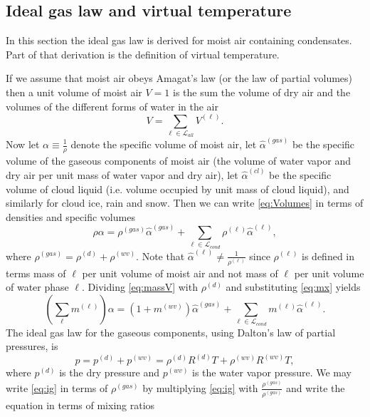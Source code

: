 \documentclass{agujournal}
\begin{document}
%
\subsection{Ideal gas law and virtual temperature}\label{sec:tv}
In this section the ideal gas law is derived for moist air containing condensates. Part of that derivation is the definition of virtual temperature. 

If we assume that moist air obeys Amagat's law (or the law of partial volumes) then a unit volume of moist air $V=1$ is the sum the volume of dry air and the volumes of the different forms of water in the air
\begin{equation}
V=\sum_{\ell \in \mathcal{L}_{all}} V^{(\ell)}.\label{eq:Volumes}
\end{equation}
Now let $\alpha\equiv \frac{1}{\rho}$ denote the specific volume of moist air, let $\hat{\alpha}^{(gas)}$ be the specific volume of the gaseous components of moist air (the volume of water vapor and dry air per unit mass of water vapor and dry air), let $\hat{\alpha}^{(cl)}$ be the specific volume of cloud liquid (i.e. volume occupied by unit mass of cloud liquid), and similarly for cloud ice, rain and snow. Then we can write \eqref{eq:Volumes} in terms of densities and specific volumes
\begin{equation}
\rho \alpha=\rho^{(gas)}\hat{\alpha}^{(gas)}+\sum_{\ell\in \mathcal{L}_{cond}}\rho^{(\ell)}\hat{\alpha}^{(\ell)},\label{eq:massV}
\end{equation}
where $\rho^{(gas)}=\rho^{(d)}+\rho^{(wv)}$. Note that $\hat{\alpha}^{(\ell)}\neq \frac{1}{\rho^{(\ell)}}$ since $\rho^{(\ell)}$ is defined in terms mass of $\ell$ per unit volume of moist air and not mass of $\ell$ per unit volume of water phase $\ell$. Dividing \eqref{eq:massV} with $\rho^{(d)}$ and substituting \eqref{eq:mx} yields
\begin{equation}
  \left(\sum_\ell m^{(\ell)}\right) \alpha = \left( 1+m^{(wv)}\right) \hat{\alpha}^{(gas)}+\sum_{\ell\in \mathcal{L}_{cond}}m^{(\ell)}\hat{\alpha}^{(\ell)}.\label{eq:vol}
\end{equation}
The ideal gas law for the gaseous components, using Dalton's law of partial pressures, is
\begin{equation}
p=p^{(d)}+p^{(wv)}=\rho^{(d)} R^{(d)} T+\rho^{(wv)} R^{(wv)} T,\label{eq:ig}
\end{equation}
where $p^{(d)}$ is the dry pressure and $p^{(wv)}$ is the water vapor pressure. We may write \eqref{eq:ig} in terms of $\rho^{(gas)}$ by multiplying \eqref{eq:ig} with $\frac{\rho^{(gas)}}{\rho^{(gas)}}$ and write the equation in terms of mixing ratios
\end{document}
